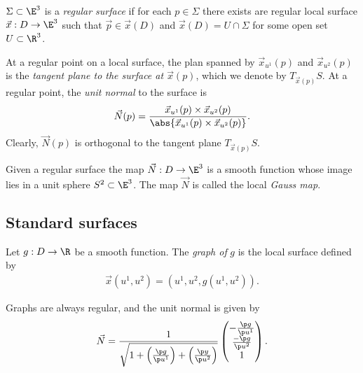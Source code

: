 \documentclass{article}
\begin{document}
\begin{definition}
    $\Sigma\subset\E^3$ is a \emph{regular surface} if for each $p\in\Sigma$ there
    exists are regular local surface $\vec x:D\to\E^3$ such that $\vec p\in\vec x(D)$
    and $\vec x(D)=U\cap\Sigma$ for some open set $U\subset\R^3$.
\end{definition}

\begin{definition}
    At a regular point on a local surface, the plan spanned by $\vec x_{u^1}(p)$ 
    and $\vec x_{u^2}(p)$ is the \emph{tangent plane to the surface at $\vec x(p)$},
    which we denote by $T_{\vec x(p)}S$. At a regular point, the \emph{unit normal}
    to the surface is 
    \begin{align*}
        \vec N(p)=\frac{\vec x_{u^1}(p)\times\vec x_{u^2}(p)}{\abs{\vec x_{u^1}(p)\times\vec x_{u^2}(p)}}.
    \end{align*}
    Clearly, $\vec N(p)$ is orthogonal to the tangent plane $T_{\vec x(p)}S$.
\end{definition}

\begin{proposition}
    Given a regular surface the map $\vec N:D\to\E^3$ is a smooth function whose
    image lies in a unit sphere $S^2\subset\E^3$. The map $\vec N$ is called the
    local \emph{Gauss map}.
\end{proposition}

\subsection{Standard surfaces}

\begin{definition}
    Let $g:D\to\R$ be a smooth function. The \emph{graph of} $g$ is the local surface 
    defined by 
    \begin{align*}
        \vec x(u^1, u^2) = (u^1, u^2, g(u^1, u^2)).
    \end{align*}
\end{definition}

\begin{proposition}
    Graphs are always regular, and the unit normal is given by
    \begin{align*}
        \vec N = \frac{1}{\sqrt{1 + \left(\frac{\p g}{\p u^1}\right) + \left(\frac{\p y}{\p u^2}\right)}}\begin{pmatrix}
            -\frac{\p g}{\p u^1} \\ \frac{-\p g}{\p u^2} \\ 1
        \end{pmatrix}.
    \end{align*}
\end{proposition}
\end{document}
